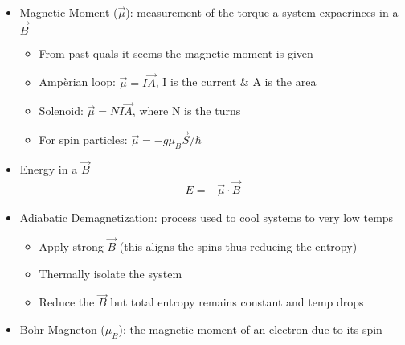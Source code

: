 \begin{itemize}
	\item Magnetic Moment ($\vec{\mu}$): measurement of the torque a system expaerinces in a $\vec{B}$
	      \begin{itemize}
		      \item From past quals it seems the magnetic moment is given
		      \item Ampèrian loop: $\vec{\mu} = I \vec{A}$, I is the current \& A is the area
		      \item Solenoid: $\vec{\mu} = N I \vec{A}$, where N is the turns
		      \item For spin particles: $\vec{\mu} = -g \mu_B \vec{S} / \hbar$
	      \end{itemize}
	\item Energy in a $\vec{B}$
	      \begin{align}
		      E = - \vec{\mu} \cdot \vec{B}
	      \end{align}
	\item Adiabatic Demagnetization: process used to cool systems to very low temps
	      \begin{itemize}
		      \item Apply strong $\vec{B}$ (this aligns the spins thus reducing the entropy)
		      \item Thermally isolate the system
		      \item Reduce the $\vec{B}$ but total entropy remains constant and temp drops
	      \end{itemize}
	\item Bohr Magneton ($\mu_B$): the magnetic moment of an electron due to its spin
\end{itemize}
